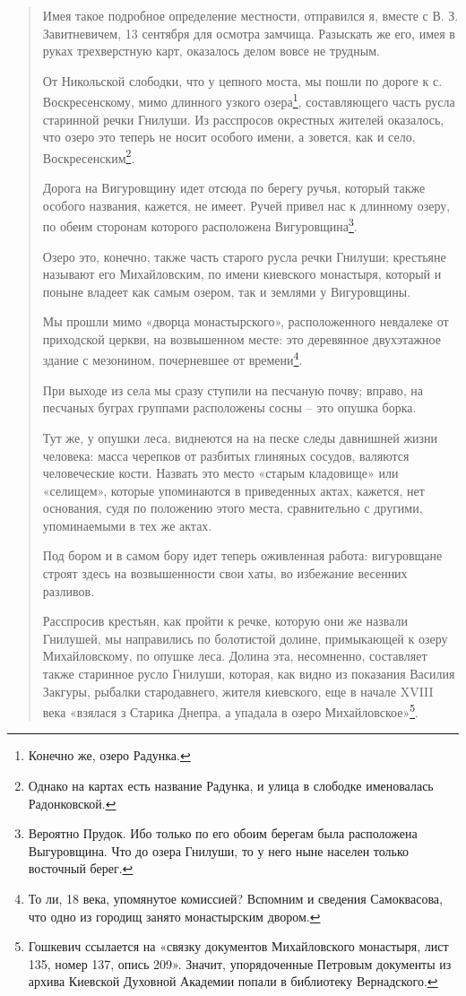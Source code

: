 \begin{quotation}
Имея такое подробное определение местности, отправился я, вместе с В. З. Завитневичем, 13 сентября для осмотра замчища. Разыскать же его, имея в руках трехверстную карт, оказалось делом вовсе не трудным.

От Никольской слободки, что у цепного моста, мы пошли по дороге к с. Воскресенскому, мимо длинного узкого озера\footnote{Конечно же, озеро Радунка.}, составляющего часть русла старинной речки Гнилуши. Из расспросов окрестных жителей оказалось, что озеро это теперь не носит особого имени, а зовется, как и село, Воскресенским\footnote{Однако на картах есть название Радунка, и улица в слободке именовалась Радонковской.}.

Дорога на Вигуровщину идет отсюда по берегу ручья, который также особого названия, кажется, не имеет. Ручей привел нас к длинному озеру, по обеим сторонам которого расположена Вигуровщина\footnote{Вероятно Прудок. Ибо только по его обоим берегам была расположена Выгуровщина. Что до озера Гнилуши, то у него ныне населен только восточный берег.}.

Озеро это, конечно, также часть старого русла речки Гнилуши; крестьяне называют его Михайловским, по имени киевского монастыря, который и поныне владеет как самым озером, так и землями у Вигуровщины.

Мы прошли мимо «дворца монастырского», расположенного невдалеке от приходской церкви, на возвышенном месте: это деревянное двухэтажное здание с мезонином, почерневшее от времени\footnote{То ли, 18 века, упомянутое комиссией? Вспомним и сведения Самоквасова, что одно из городищ занято монастырским двором.}. 

При выходе из села мы сразу ступили на песчаную почву; вправо, на песчаных буграх группами расположены сосны – это опушка борка. 

Тут же, у опушки леса, виднеются на на песке следы давнишней жизни человека: масса черепков от разбитых глиняных сосудов, валяются человеческие кости. Назвать это место «старым кладовище» или «селищем», которые упоминаются в приведенных актах, кажется, нет основания, судя по положению этого места, сравнительно с другими, упоминаемыми в тех же актах.

Под бором и в самом бору идет теперь оживленная работа: вигуровщане строят здесь на возвышенности свои хаты, во избежание весенних разливов.

Расспросив крестьян, как пройти к речке, которую они же назвали Гнилушей, мы направились по болотистой долине, примыкающей к озеру Михайловскому, по опушке леса. Долина эта, несомненно, составляет также старинное русло Гнилуши, которая, как видно из показания Василия Закгуры, рыбалки стародавнего, жителя киевского, еще в начале XVIII века «взялася з Старика Днепра, а упадала в озеро Михайловское»\footnote{Гошкевич ссылается на «связку документов Михайловского монастыря, лист 135, номер 137, опись 209». Значит, упорядоченные Петровым документы из архива Киевской Духовной Академии попали в библиотеку Вернадского.}.


\end{quotation}
